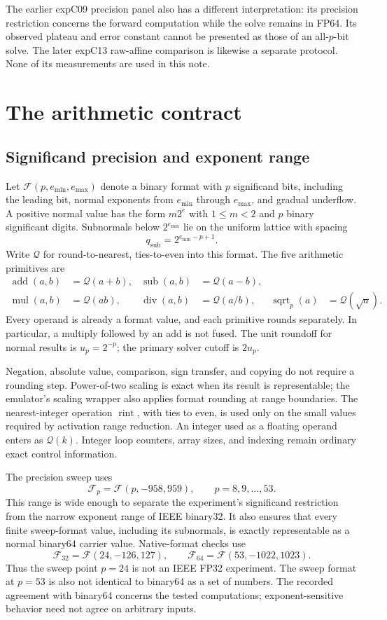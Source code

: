\documentclass[11pt]{article}
\newcommand{\Q}{\mathcal Q}
\newcommand{\add}{\operatorname{add}}
\newcommand{\sub}{\operatorname{sub}}
\newcommand{\mul}{\operatorname{mul}}
\newcommand{\dv}{\operatorname{div}}
\newcommand{\rint}{\operatorname{rint}}
\begin{document}
The earlier expC09 precision panel also has a different interpretation: its
precision restriction concerns the forward computation while the solve remains
in FP64. Its observed plateau and error constant cannot be presented as those
of an all-$p$-bit solve. The later expC13 raw-affine comparison is likewise a
separate protocol. None of its measurements are used in this note.

\section{The arithmetic contract}

\subsection{Significand precision and exponent range}
Let $\mathcal F(p,e_{\min},e_{\max})$ denote a binary format with $p$
significand bits, including the leading bit, normal exponents from $e_{\min}$
through $e_{\max}$, and gradual underflow. A positive normal value has the form
$m2^e$ with $1\le m<2$ and $p$ binary significant digits. Subnormals below
$2^{e_{\min}}$ lie on the uniform lattice with spacing
\[
 q_{\mathrm{sub}}=2^{e_{\min}-p+1}.
\]
Write $\Q$ for round-to-nearest, ties-to-even into this format. The five
arithmetic primitives are
\begin{align*}
 \add(a,b)&=\Q(a+b), & \sub(a,b)&=\Q(a-b),\\
 \mul(a,b)&=\Q(ab), & \dv(a,b)&=\Q(a/b), &
 \operatorname{sqrt}_{p}(a)&=\Q(\sqrt a).
\end{align*}
Every operand is already a format value, and each primitive rounds separately.
In particular, a multiply followed by an add is not fused. The unit roundoff
for normal results is $u_p=2^{-p}$; the primary solver cutoff is $2u_p$.

Negation, absolute value, comparison, sign transfer, and copying do not require
a rounding step. Power-of-two scaling is exact when its result is
representable; the emulator's scaling wrapper also applies format rounding at
range boundaries. The nearest-integer operation $\rint$, with ties to even,
is used only on the small values required by activation range reduction. An
integer used as a floating operand enters as $\Q(k)$. Integer loop counters,
array sizes, and indexing remain ordinary exact control information.

The precision sweep uses
\[
 \mathcal F_p=\mathcal F(p,-958,959),\qquad p=8,9,\ldots,53.
\]
This range is wide enough to separate the experiment's significand restriction
from the narrow exponent range of IEEE binary32. It also ensures that every
finite sweep-format value, including its subnormals, is exactly representable
as a normal binary64 carrier value. Native-format checks use
\[
 \mathcal F_{32}=\mathcal F(24,-126,127),\qquad
 \mathcal F_{64}=\mathcal F(53,-1022,1023).
\]
Thus the sweep point $p=24$ is not an IEEE FP32 experiment. The sweep format at
$p=53$ is also not identical to binary64 as a set of numbers. The recorded
agreement with binary64 concerns the tested computations; exponent-sensitive
behavior need not agree on arbitrary inputs.
\end{document}
